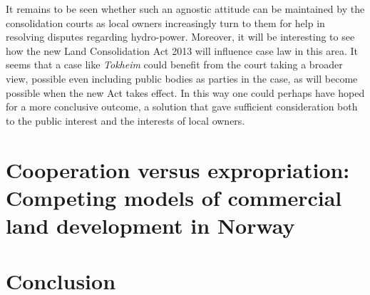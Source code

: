 \documentclass[10pt]{article} %
\begin{document}
It remains to be seen whether such an agnostic attitude can be maintained by the consolidation courts as local owners increasingly turn to them for help in resolving disputes regarding hydro-power. Moreover, it will be interesting to see how the new Land Consolidation Act 2013 will influence case law in this area. It seems that a case like \emph{Tokheim} could benefit from the court taking a broader view, possible even including public bodies as parties in the case, as will become possible when the new Act takes effect. In this way one could perhaps have hoped for a more conclusive outcome, a solution that gave sufficient consideration both to the public interest and the interests of local owners.

\section{Cooperation versus expropriation: Competing models of commercial land development in Norway}\label{sec:5}

\section{Conclusion}\label{sec:6}



\end{document}
